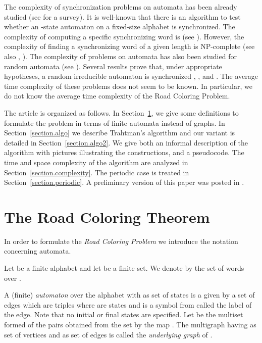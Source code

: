 \documentclass[11pt,a4paper]{article}
\begin{document}
The complexity of synchronization problems on automata has been
already studied (see \cite{KariVolkov2013} for a survey). It is
well-known that there is an  algorithm to test whether an
-state automaton on a fixed-size alphabet is synchronized. The
complexity of computing a specific synchronizing word is  (see
\cite{Eppstein1990}).  However, the complexity of finding a
synchronizing word of a given length is NP-complete
\cite{Eppstein1990} (see also \cite{OlschewskiUmmels2010},
\cite{Roman2011}). The complexity of problems on automata has also
been studied for random automata (see
\cite{CarayolNicaud2012}). Several results prove that, under
appropriate hypotheses, a random irreducible automaton is synchronized
\cite{FreilingEtAl2003}, \cite{SkvortsovZaks2010}, and
\cite{Nicaud2013}. The average time complexity of these problems does not
seem to be known. In particular, we do not know the average time
complexity of the Road Coloring Problem.


The article is organized as follows. In Section~\ref{section.road}, we
give some definitions to formulate the problem in terms of finite
automata instead of graphs. In Section~\ref{section.algo} we describe
Trahtman's algorithm and our variant is detailed in
Section~\ref{section.algo2}. We give both an informal description of
the algorithm with pictures illustrating the constructions, and a
pseudocode. The time and space complexity of the algorithm are
analyzed in Section~\ref{section.complexity}. The periodic case is
treated in Section~\ref{section.periodic}. A preliminary version of this paper was posted in \cite{BealPerrin2008}.

\section{The Road Coloring Theorem} \label{section.road} 

In order to formulate the \emph{Road Coloring Problem} we introduce
the notation concerning automata.  

Let  be a finite alphabet and let  be a finite set.  We denote
by  the set of words over . 

A (finite) \emph{automaton}  over the alphabet  with 
as set of states is a given by a set  of edges which are triples
 where  are states and  is a symbol from  called
the label of the edge. Note that no initial or final states are
specified.  Let  be the multiset formed of the pairs 
obtained from the set  by the map .  The
multigraph having  as set of vertices and  as set of edges is
called the \emph{underlying graph} of .
\end{document}
